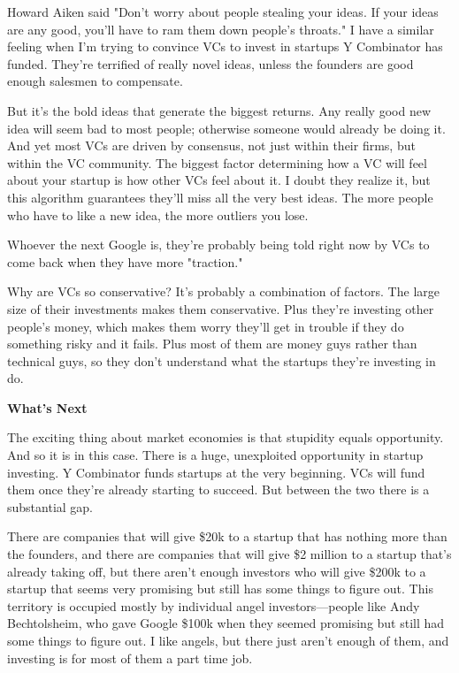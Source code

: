 Howard Aiken said "Don't worry about people
                  stealing your ideas. If your ideas are any good, you'll have
                  to ram them down people's throats." I have a similar feeling
                  when I'm trying to convince VCs to invest in startups Y
                  Combinator has funded. They're terrified of really novel
                  ideas, unless the founders are good enough salesmen to
                  compensate.

But it's the bold ideas that generate
                  the biggest returns. Any really good new idea will seem bad to
                  most people; otherwise someone would already be doing it. And
                  yet most VCs are driven by consensus, not just within their
                  firms, but within the VC community. The biggest factor
                  determining how a VC will feel about your startup is how other
                  VCs feel about it. I doubt they realize it, but this algorithm
                  guarantees they'll miss all the very best ideas. The more
                  people who have to like a new idea, the more outliers you
                  lose.

Whoever the next Google is, they're probably
                  being told right now by VCs to come back when they have more
                  "traction."

Why are VCs so conservative? It's
                  probably a combination of factors. The large size of their
                  investments makes them conservative. Plus they're investing
                  other people's money, which makes them worry they'll get in
                  trouble if they do something risky and it fails. Plus most of
                  them are money guys rather than technical guys, so they don't
                  understand what the startups they're investing in do.

\textbf{What's Next}

The exciting thing about market economies is that
                  stupidity equals opportunity. And so it is in this case. There
                  is a huge, unexploited opportunity in startup investing. Y
                  Combinator funds startups at the very beginning. VCs will fund
                  them once they're already starting to succeed. But between the
                  two there is a substantial gap.

There are companies
                  that will give \$20k to a startup that has nothing more than
                  the founders, and there are companies that will give \$2
                  million to a startup that's already taking off, but there
                  aren't enough investors who will give \$200k to a startup that
                  seems very promising but still has some things to figure out.
                  This territory is occupied mostly by individual angel
                  investors---people like Andy Bechtolsheim, who gave Google
                  \$100k when they seemed promising but still had some things to
                  figure out. I like angels, but there just aren't enough of
                  them, and investing is for most of them a part time job.

